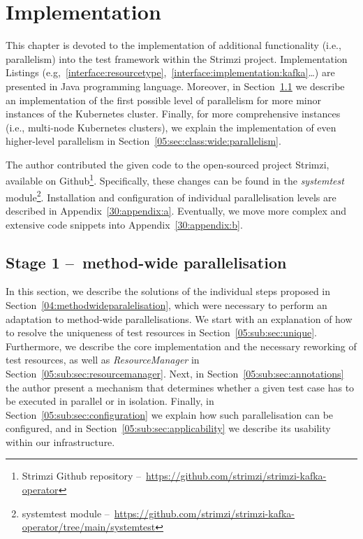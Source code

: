 \chapter{Implementation}
\label{05:chapter:title}

This chapter is devoted to the implementation of additional functionality (i.e., parallelism) into the test framework within the Strimzi project.
Implementation Listings (e.g,~\ref{interface:resourcetype},~\ref{interface:implementation:kafka}\dots) are presented in Java programming language.
Moreover, in Section~\ref{05:sec:method:wide:parallelism} we describe an implementation of the first possible level of
parallelism for more minor instances of the Kubernetes cluster.
Finally, for more comprehensive instances (i.e., multi-node Kubernetes clusters),
we explain the implementation of even higher-level parallelism in Section~\ref{05:sec:class:wide:parallelism}.

The author contributed the given code to the open-sourced project Strimzi, available on
Github\footnote{Strimzi Github repository \---\ \url{https://github.com/strimzi/strimzi-kafka-operator}}.
Specifically, these changes can be found in the \emph{systemtest} module\footnote{systemtest module \---\ \url{https://github.com/strimzi/strimzi-kafka-operator/tree/main/systemtest}}.
Installation and configuration of individual parallelisation levels are described in Appendix~\ref{30:appendix:a}.
Eventually, we move more complex and extensive code snippets into Appendix~\ref{30:appendix:b}.

\section{Stage 1 \---\ method-wide parallelisation}
\label{05:sec:method:wide:parallelism}

In this section, we describe the solutions of the individual steps proposed in Section~\ref{04:methodwideparalelisation},
which were necessary to perform an adaptation to method-wide parallelisations.
We start with an explanation of how to resolve the uniqueness of test resources in Section~\ref{05:sub:sec:unique}.
Furthermore, we describe the core implementation and the necessary reworking of test resources, as well as \emph{ResourceManager} in Section~\ref{05:sub:sec:resourcemanager}.
Next, in Section~\ref{05:sub:sec:annotations} the author present a mechanism that determines whether a given test case has to be executed in parallel or in isolation.
Finally, in Section~\ref{05:sub:sec:configuration} we explain how such parallelisation can be configured, and in Section~\ref{05:sub:sec:applicability} we describe its usability within our infrastructure.

